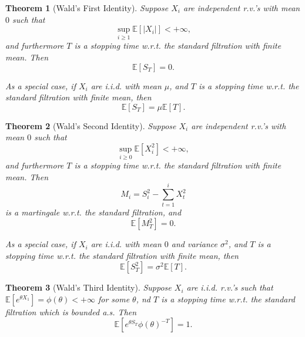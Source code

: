 \documentclass[openany]{book}
\newtheorem{theorem}{Theorem}[chapter]
\theoremstyle{definition}
\theoremstyle{remark}
\begin{document}
\begin{theorem}[Wald's First Identity]
    Suppose $X_i$ are independent r.v.'s with mean $0$ such that
    \begin{equation*}
        \sup_{i\ge1}\mathbb{E}\left[|X_i|\right]<+\infty,
    \end{equation*}
    and furthermore $T$ is a stopping time w.r.t. the standard filtration with finite mean. Then
    \begin{equation*}
        \mathbb{E}[S_T]=0.
    \end{equation*}

    As a special case, if $X_i$ are i.i.d. with mean $\mu$, and $T$ is a stopping time w.r.t. the standard filtration with finite mean, then
    \begin{equation*}
        \mathbb{E}[S_T]=\mu \mathbb{E}[T].
    \end{equation*}
\end{theorem}
\begin{theorem}[Wald's Second Identity]
    Suppose $X_i$ are independent r.v.'s with mean $0$ such that
    \begin{equation*}
        \sup_{i\ge0}\mathbb{E}[X_i^2]<+\infty,
    \end{equation*}
    and furthermore $T$ is a stopping time w.r.t. the standard filtration with finite mean. Then
    \begin{equation*}
        M_i=S_i^2-\sum_{t=1}^{i}X_t^2
    \end{equation*}
    is a martingale w.r.t. the standard filtration, and
    \begin{equation*}
        \mathbb{E}[M_T^2]=0.
    \end{equation*}

    As a special case, if $X_i$ are i.i.d. with mean $0$ and variance $\sigma^2$, and $T$ is a stopping time w.r.t. the standard filtration with finite mean, then
    \begin{equation*}
        \mathbb{E}[S_T^2]=\sigma^2 \mathbb{E}[T].
    \end{equation*}
\end{theorem}
\begin{theorem}[Wald's Third Identity]
    Suppose $X_i$ are i.i.d. r.v.'s such that $\mathbb{E}[e^{\theta X_1}]=\phi(\theta)<+\infty$ for some $\theta$, nd $T$ is a stopping time w.r.t. the standard filtration which is bounded a.s. Then
    \begin{equation*}
        \mathbb{E}\left[e^{\theta S_T}\phi(\theta)^{-T}\right]=1.
    \end{equation*}
\end{theorem}
\end{document}
